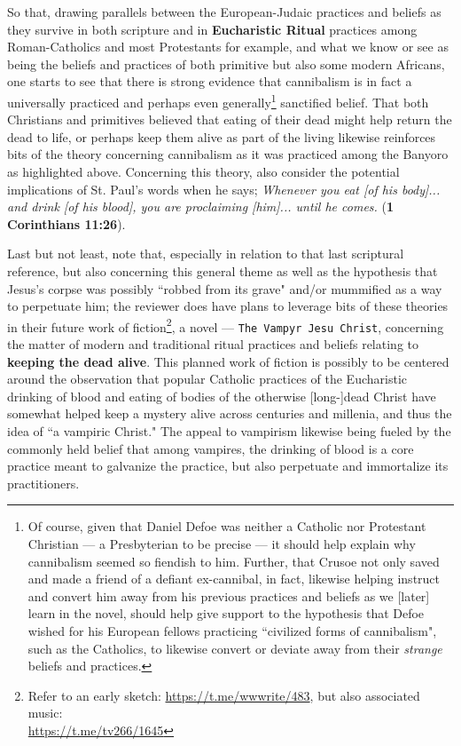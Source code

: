 \documentclass[a4paper]{article}
\begin{document}
So that, drawing parallels between the European-Judaic practices and beliefs as they survive in both scripture and in \textbf{Eucharistic Ritual} practices among Roman-Catholics and most Protestants for example, and what we know or see as being the beliefs and practices of both primitive but also some modern Africans, one starts to see that there is strong evidence that cannibalism is in fact a universally practiced and perhaps even generally\footnote{Of course, given that Daniel Defoe was neither a Catholic nor Protestant Christian --- a Presbyterian to be precise --- it should help explain why cannibalism seemed so fiendish to him. Further, that Crusoe not only saved and made a friend of a defiant ex-cannibal, in fact, likewise helping instruct and convert him away from his previous practices and beliefs as we [later] learn in the novel, should help give support to the hypothesis that Defoe wished for his European fellows practicing ``civilized forms of cannibalism", such as the Catholics, to likewise convert or deviate away from their \textit{strange} beliefs and practices.} sanctified belief. That both Christians and primitives believed that eating of their dead might help return the dead to life, or perhaps keep them alive as part of the living likewise reinforces bits of the theory concerning cannibalism as it was practiced among the Banyoro as highlighted above. Concerning this theory, also consider the potential implications of St. Paul's words when he says; \textit{Whenever you eat [of his body]... and drink [of his blood], you are proclaiming [him]... until he comes.} (\textbf{1 Corinthians 11:26}).

Last but not least, note that, especially in relation to that last scriptural reference, but also concerning this general theme as well as the hypothesis that Jesus's corpse was possibly ``robbed from its grave" and/or mummified as a way to perpetuate him; the reviewer does have plans to leverage bits of these theories in their future work of fiction\footnote{Refer to an early sketch: \url{https://t.me/wwwrite/483}, but also associated music:\\ \url{https://t.me/tv266/1645}}, a novel --- \texttt{The Vampyr Jesu Christ}, concerning the matter of modern and traditional ritual practices and beliefs relating to \textbf{keeping the dead alive}. This planned work of fiction is possibly to be centered around the observation that popular Catholic practices of the Eucharistic drinking of blood and eating of bodies of the otherwise [long-]dead Christ have somewhat helped keep a mystery alive across centuries and millenia, and thus the idea of ``a vampiric Christ." The appeal to vampirism likewise being fueled by the commonly held belief that among vampires, the drinking of blood is a core practice meant to galvanize the practice, but also perpetuate and immortalize its practitioners.
\end{document}
